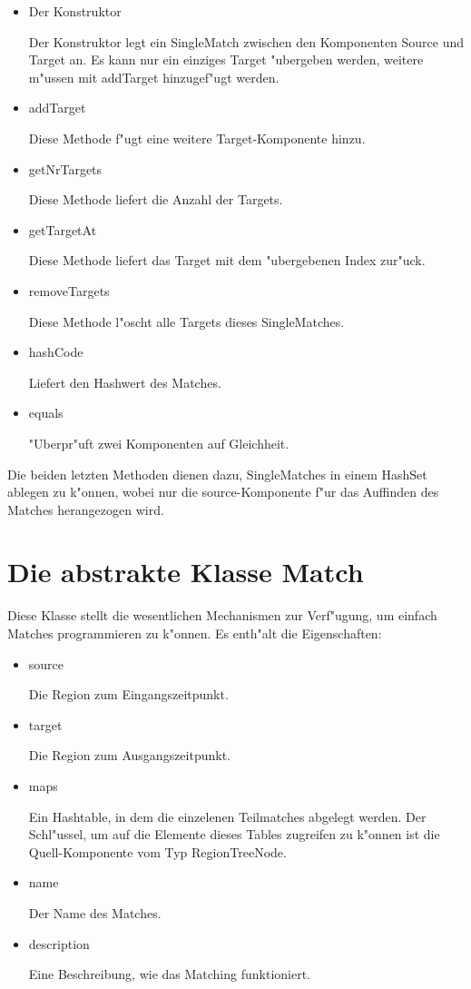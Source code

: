 \documentclass[a4paper,10pt,twoside]{scrreprt}
\begin{document}
\begin{itemize}
\item Der Konstruktor

Der Konstruktor legt ein SingleMatch zwischen den Komponenten Source und Target an. Es kann nur ein einziges Target "ubergeben werden, weitere m"ussen mit addTarget hinzugef"ugt werden.



\item addTarget

Diese Methode f"ugt eine weitere Target-Komponente hinzu.

\item getNrTargets

Diese Methode liefert die Anzahl der Targets.

\item getTargetAt

Diese Methode liefert das Target mit dem "ubergebenen Index zur"uck.

\item removeTargets

Diese Methode l"oscht alle Targets dieses SingleMatches.

\item hashCode

Liefert den Hashwert des Matches.

\item equals

"Uberpr"uft zwei Komponenten auf Gleichheit.

\end{itemize}

Die beiden letzten Methoden dienen dazu, SingleMatches in einem HashSet ablegen zu k"onnen, wobei nur die source-Komponente f"ur das Auffinden des Matches herangezogen wird.

\section{Die abstrakte Klasse Match}
Diese Klasse stellt die wesentlichen Mechanismen zur Verf"ugung, um einfach Matches programmieren zu k"onnen. Es enth"alt die Eigenschaften:
\begin{itemize}
\item source

Die Region zum Eingangszeitpunkt.

\item target

Die Region zum Ausgangszeitpunkt.

\item maps

Ein Hashtable, in dem die einzelenen Teilmatches abgelegt werden. Der Schl"ussel, um auf die Elemente dieses Tables zugreifen zu k"onnen ist die Quell-Komponente vom Typ RegionTreeNode.

\item name

Der Name des Matches.

\item description

Eine Beschreibung, wie das Matching funktioniert.
\end{itemize} 
\end{document}

